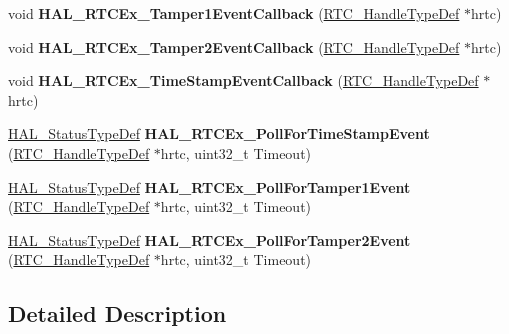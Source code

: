 \begin{DoxyCompactItemize}
\item 
\mbox{\label{group___r_t_c_ex___exported___functions___group1_gad849caf1e7b4774af56388a13636ba73}} 
void {\bfseries H\+A\+L\+\_\+\+R\+T\+C\+Ex\+\_\+\+Tamper1\+Event\+Callback} (\hyperlink{struct_r_t_c___handle_type_def}{R\+T\+C\+\_\+\+Handle\+Type\+Def} $\ast$hrtc)
\item 
\mbox{\label{group___r_t_c_ex___exported___functions___group1_ga14086326964355aaf3793ad3157ea7c3}} 
void {\bfseries H\+A\+L\+\_\+\+R\+T\+C\+Ex\+\_\+\+Tamper2\+Event\+Callback} (\hyperlink{struct_r_t_c___handle_type_def}{R\+T\+C\+\_\+\+Handle\+Type\+Def} $\ast$hrtc)
\item 
\mbox{\label{group___r_t_c_ex___exported___functions___group1_gac9ef67f1f1698e9560a5ecd5e8c9a330}} 
void {\bfseries H\+A\+L\+\_\+\+R\+T\+C\+Ex\+\_\+\+Time\+Stamp\+Event\+Callback} (\hyperlink{struct_r_t_c___handle_type_def}{R\+T\+C\+\_\+\+Handle\+Type\+Def} $\ast$hrtc)
\item 
\mbox{\label{group___r_t_c_ex___exported___functions___group1_gaff8adc3d27b9c84c69b64ffa6ad43457}} 
\hyperlink{stm32f4xx__hal__def_8h_a63c0679d1cb8b8c684fbb0632743478f}{H\+A\+L\+\_\+\+Status\+Type\+Def} {\bfseries H\+A\+L\+\_\+\+R\+T\+C\+Ex\+\_\+\+Poll\+For\+Time\+Stamp\+Event} (\hyperlink{struct_r_t_c___handle_type_def}{R\+T\+C\+\_\+\+Handle\+Type\+Def} $\ast$hrtc, uint32\+\_\+t Timeout)
\item 
\mbox{\label{group___r_t_c_ex___exported___functions___group1_gadea47894c36fc74044106654c081070b}} 
\hyperlink{stm32f4xx__hal__def_8h_a63c0679d1cb8b8c684fbb0632743478f}{H\+A\+L\+\_\+\+Status\+Type\+Def} {\bfseries H\+A\+L\+\_\+\+R\+T\+C\+Ex\+\_\+\+Poll\+For\+Tamper1\+Event} (\hyperlink{struct_r_t_c___handle_type_def}{R\+T\+C\+\_\+\+Handle\+Type\+Def} $\ast$hrtc, uint32\+\_\+t Timeout)
\item 
\mbox{\label{group___r_t_c_ex___exported___functions___group1_ga974cfcdcbc9a6fc70effcf1c701ba535}} 
\hyperlink{stm32f4xx__hal__def_8h_a63c0679d1cb8b8c684fbb0632743478f}{H\+A\+L\+\_\+\+Status\+Type\+Def} {\bfseries H\+A\+L\+\_\+\+R\+T\+C\+Ex\+\_\+\+Poll\+For\+Tamper2\+Event} (\hyperlink{struct_r_t_c___handle_type_def}{R\+T\+C\+\_\+\+Handle\+Type\+Def} $\ast$hrtc, uint32\+\_\+t Timeout)
\end{DoxyCompactItemize}


\subsection{Detailed Description}
